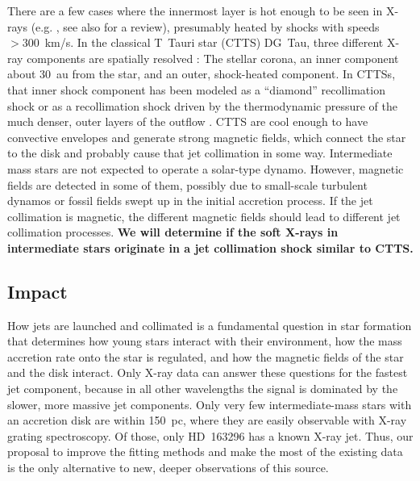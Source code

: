 \documentclass[fleqn,12pt,onecolumn]{SelfArx} %
\begin{document}
There are a few cases where the innermost layer is hot enough to be seen in X-rays (e.g. \cite{2005ApJ...628..811S,2008A&A...478..797G}, see also \cite{2022hxga.book...57S} for a review), presumably heated by shocks with speeds $>300$~km/s. In the classical T~Tauri star (CTTS) DG~Tau, three different X-ray components are spatially resolved \cite{2008A&A...488L..13S,2011ASPC..448..617G}: The stellar corona, an inner component about 30~au from the star, and an outer, shock-heated component. In CTTSs, that inner shock component has been modeled as a ``diamond'' recollimation shock \cite{2016A&A...596A..99U} or as a recollimation shock driven by the thermodynamic pressure of the much denser, outer layers of the outflow \cite{2014ApJ...795...51G}. CTTS are cool enough to have convective envelopes and generate strong magnetic fields, which connect the star to the disk and probably cause that jet collimation in some way.
Intermediate mass stars are not expected to operate a solar-type dynamo. However, magnetic fields are detected in some of them, possibly due to small-scale turbulent dynamos or fossil fields swept up in the initial accretion process. If the jet collimation is magnetic, the different magnetic fields should lead to different jet collimation processes.
\textbf{We will determine if the soft X-rays in intermediate stars originate in a jet collimation shock similar to CTTS.}

\subsection{Impact}
How jets are launched and collimated is a fundamental question in star formation that determines how young stars interact with their environment, how the mass accretion rate onto the star is regulated, and how the magnetic fields of the star and the disk interact. Only X-ray data can answer these questions for the fastest jet component, because in all other wavelengths the signal is dominated by the slower, more massive jet components.
Only very few intermediate-mass stars with an accretion disk are within 150~pc, where they are easily observable with X-ray grating spectroscopy. Of those, only HD~163296 has a known X-ray jet. Thus, our proposal to improve the fitting methods and make the most of the existing data is the only alternative to new, deeper observations of this source.
\end{document}
